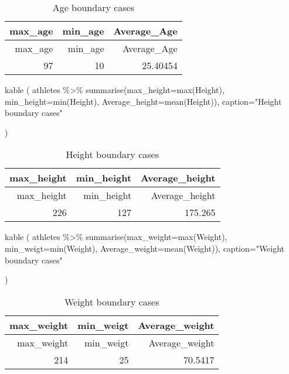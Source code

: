 \documentclass[
]{article}
\newenvironment{Shaded}{\begin{snugshade}}{\end{snugshade}}
\newcommand{\AttributeTok}[1]{\textcolor[rgb]{0.77,0.63,0.00}{#1}}
\newcommand{\FunctionTok}[1]{\textcolor[rgb]{0.00,0.00,0.00}{#1}}
\newcommand{\NormalTok}[1]{#1}
\newcommand{\SpecialCharTok}[1]{\textcolor[rgb]{0.00,0.00,0.00}{#1}}
\newcommand{\StringTok}[1]{\textcolor[rgb]{0.31,0.60,0.02}{#1}}
\begin{document}
\begin{longtable}[]{@{}rrr@{}}
\caption{Age boundary cases}\tabularnewline
\toprule
max\_age & min\_age & Average\_Age \\
\midrule
\endfirsthead
\toprule
max\_age & min\_age & Average\_Age \\
\midrule
\endhead
97 & 10 & 25.40454 \\
\bottomrule
\end{longtable}

\begin{Shaded}
\begin{Highlighting}[]
\FunctionTok{kable}\NormalTok{ (}
\NormalTok{athletes }\SpecialCharTok{\%\textgreater{}\%}
\FunctionTok{summarise}\NormalTok{(}\AttributeTok{max\_height=}\FunctionTok{max}\NormalTok{(Height), }\AttributeTok{min\_height=}\FunctionTok{min}\NormalTok{(Height), }\AttributeTok{Average\_height=}\FunctionTok{mean}\NormalTok{(Height)),}
\AttributeTok{caption=}\StringTok{"Height boundary cases"}

\NormalTok{)}
\end{Highlighting}
\end{Shaded}

\begin{longtable}[]{@{}rrr@{}}
\caption{Height boundary cases}\tabularnewline
\toprule
max\_height & min\_height & Average\_height \\
\midrule
\endfirsthead
\toprule
max\_height & min\_height & Average\_height \\
\midrule
\endhead
226 & 127 & 175.265 \\
\bottomrule
\end{longtable}

\begin{Shaded}
\begin{Highlighting}[]
\FunctionTok{kable}\NormalTok{ (}
\NormalTok{athletes }\SpecialCharTok{\%\textgreater{}\%}
\FunctionTok{summarise}\NormalTok{(}\AttributeTok{max\_weight=}\FunctionTok{max}\NormalTok{(Weight), }\AttributeTok{min\_weigt=}\FunctionTok{min}\NormalTok{(Weight), }\AttributeTok{Average\_weight=}\FunctionTok{mean}\NormalTok{(Weight)),}
\AttributeTok{caption=}\StringTok{"Weight boundary cases"}

\NormalTok{)}
\end{Highlighting}
\end{Shaded}

\begin{longtable}[]{@{}rrr@{}}
\caption{Weight boundary cases}\tabularnewline
\toprule
max\_weight & min\_weigt & Average\_weight \\
\midrule
\endfirsthead
\toprule
max\_weight & min\_weigt & Average\_weight \\
\midrule
\endhead
214 & 25 & 70.5417 \\
\bottomrule
\end{longtable}
\end{document}
